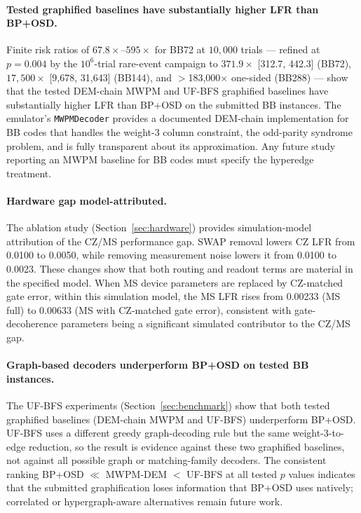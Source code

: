 \documentclass[11pt,a4paper]{article}
\begin{document}
\paragraph{Tested graphified baselines have substantially higher LFR than BP+OSD.}
Finite risk ratios of $67.8\times$--$595\times$ for BB72 at $10{,}000$
trials --- refined at $p=0.004$ by the $10^{6}$-trial rare-event campaign
to $371.9\times$ [312.7, 442.3] (BB72), $17{,}500\times$ [9{,}678,
31{,}643] (BB144), and $>$183{,}000$\times$ one-sided (BB288) --- show that the tested DEM-chain MWPM and UF-BFS graphified baselines have substantially higher LFR than BP+OSD on the submitted BB instances.
The emulator's \texttt{MWPMDecoder} provides a documented DEM-chain implementation for BB codes that handles the weight-3 column constraint, the odd-parity syndrome problem, and is fully transparent
about its approximation.
Any future study reporting an MWPM baseline for BB codes must specify
the hyperedge treatment.

\paragraph{Hardware gap model-attributed.}
The ablation study (Section~\ref{sec:hardware}) provides simulation-model attribution of the CZ/MS performance gap.
SWAP removal lowers CZ LFR from 0.0100 to 0.0050, while removing measurement noise lowers it from 0.0100 to 0.0023.
These changes show that both routing and readout terms are material in the specified model.
When MS device parameters are replaced by CZ-matched gate error,
within this simulation model, the MS LFR rises from 0.00233 (MS full) to 0.00633
(MS with CZ-matched gate error), consistent with gate-decoherence parameters
being a significant simulated contributor to the CZ/MS gap.

\paragraph{Graph-based decoders underperform BP+OSD on tested BB instances.}
The UF-BFS experiments (Section~\ref{sec:benchmark}) show that both tested graphified baselines (DEM-chain MWPM and UF-BFS) underperform BP+OSD.
UF-BFS uses a different greedy graph-decoding rule but the same weight-3-to-edge reduction, so the result is evidence against these two graphified baselines, not against all possible graph or matching-family decoders.
The consistent ranking BP+OSD $\ll$ MWPM-DEM $<$ UF-BFS at all tested $p$ values indicates that the submitted graphification loses information that BP+OSD uses natively; correlated or hypergraph-aware alternatives remain future work.
\end{document}
